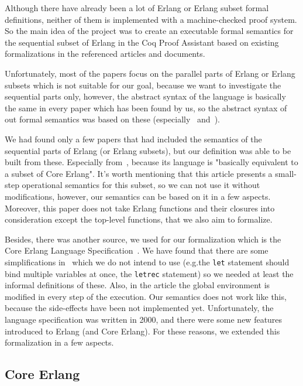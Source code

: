 \documentclass[12pt]{article}
\theoremstyle{definition}
\numberwithin{equation}{section}
\begin{document}
Although there have already been a lot of Erlang or Erlang subset formal definitions, neither of them is implemented with a machine-checked proof system. So the main idea of the project was to create an executable formal semantics for the sequential subset of Erlang in the Coq Proof Assistant based on existing formalizations in the referenced articles and documents.

Unfortunately, most of the papers focus on the parallel parts of Erlang or Erlang subsets which is not suitable for our goal, because we want to investigate the sequential parts only, however, the abstract syntax of the language is basically the same in every paper which has been found by us, so the abstract syntax of out formal semantics was based on these (especially~\cite{neuhausser2007abstraction} and~\cite{nishida2016reversible}).

We had found only a few papers that had included the semantics of the sequential parts of Erlang (or Erlang subsets), but our definition was able to be built from these. Especially from~\cite{nishida2016reversible}, because its language is "basically equivalent to a subset of Core Erlang". It's worth mentioning that this article presents a small-step operational semantics for this subset, so we can not use it without modifications, however, our semantics can be based on it in a few aspects. Moreover, this paper does not take Erlang functions and their closures into consideration except the top-level functions, that we also aim to formalize.

Besides, there was another source, we used for our formalization which is the Core Erlang Language Specification~\cite{carlsson2000core}. We have found that there are some simplifications in~\cite{nishida2016reversible} which we do not intend to use (e.g.the \verb|let| statement should bind multiple variables at once, the \verb|letrec| statement) so we needed at least the informal definitions of these. Also, in the article \cite{nishida2016reversible} the global environment is modified in every step of the execution. Our semantics does not work like this, because the side-effects have been not implemented yet. Unfortunately, the language specification was written in 2000, and there were some new features introduced to Erlang (and Core Erlang). For these reasons, we extended this formalization in a few aspects.

\subsection{Core Erlang}
\end{document}
